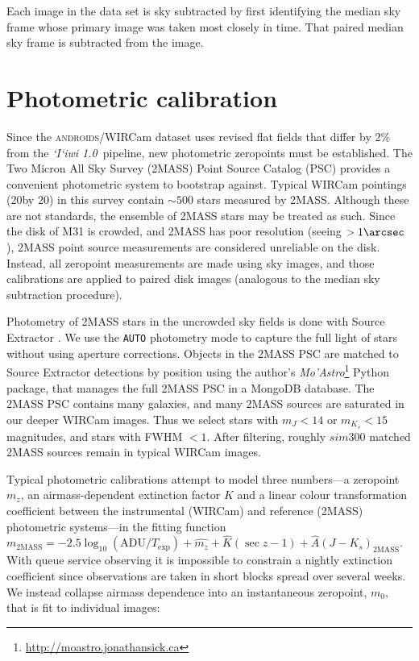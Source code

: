 \documentclass[iop]{emulateapj}
\newcommand{\sw}[1]{\textit{#1}} %
\newcommand{\iiwione}{\sw{`I`iwi 1.0}}
\newcommand{\androids}{\textsc{androids}}
\begin{document}
Each image in the data set is sky subtracted by first identifying the median sky frame whose primary image was taken most closely in time. That paired median sky frame is subtracted from the image.


\section{Photometric calibration}
\label{sec:photocal}

Since the \androids/WIRCam dataset uses revised flat fields that differ by 2\% from the \iiwione\ pipeline, new photometric zeropoints must be established.
The Two Micron All Sky Survey (2MASS) Point Source Catalog (PSC) \citep{Skrutskie:2006} provides a convenient photometric system to bootstrap against.
Typical WIRCam pointings (20\arcmin by 20\arcmin) in this survey contain $\sim 500$ stars measured by 2MASS.
Although these are not standards, the ensemble of 2MASS stars may be treated as such.
Since the disk of M31 is crowded, and 2MASS has poor resolution (seeing $> 1\arcsec$), 2MASS point source measurements are considered unreliable on the disk.
Instead, all zeropoint measurements are made using sky images, and those calibrations are applied to paired disk images (analogous to the median sky subtraction procedure).

Photometry of 2MASS stars in the uncrowded sky fields is done with Source Extractor \citep{Bertin:1996}.
We use the \texttt{AUTO} photometry mode to capture the full light of stars without using aperture corrections.
Objects in the 2MASS PSC are matched to Source Extractor detections by position using the author's \sw{Mo'Astro}\footnote{\url{http://moastro.jonathansick.ca}} Python package, that manages the full 2MASS PSC in a MongoDB database.
The 2MASS PSC contains many galaxies, and many 2MASS sources are saturated in our deeper WIRCam images.
Thus we select stars with $m_J < 14$ or $m_{K_s} < 15$ magnitudes, and stars with FWHM $<1$\arcsec.
After filtering, roughly $sim 300$ matched 2MASS sources remain in typical WIRCam images.

Typical photometric calibrations attempt to model three numbers---a zeropoint $m_z$, an airmass-dependent extinction factor $K$ and a linear colour transformation coefficient between the instrumental (WIRCam) and reference (2MASS) photometric systems---in the fitting function $m_\mathrm{2MASS} = -2.5 \log_{10}(\mathrm{ADU}/T_\mathrm{exp}) + \hat{m_z} + \hat{K} (\sec z -1) + \hat{A} (J-K_s)_\mathrm{2MASS}$.
With queue service observing it is impossible to constrain a nightly extinction coefficient since observations are taken in short blocks spread over several weeks.
We instead collapse airmass dependence into an instantaneous zeropoint, $m_0$, that is fit to individual images:
\end{document}
